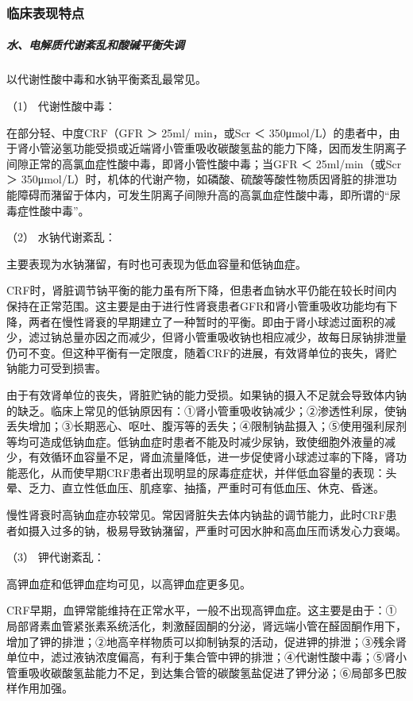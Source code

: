 \subsubsection{临床表现特点}

\subparagraph{水、电解质代谢紊乱和酸碱平衡失调}

以代谢性酸中毒和水钠平衡紊乱最常见。

\hypertarget{text00085.htmlux5cux23CHP3-8-6-1-1-1}{}
（1） 代谢性酸中毒：

在部分轻、中度CRF（GFR ＞ 25ml/ min，或Scr ＜
350μmol/L）的患者中，由于肾小管泌氢功能受损或近端肾小管重吸收碳酸氢盐的能力下降，因而发生阴离子间隙正常的高氯血症性酸中毒，即肾小管性酸中毒；当GFR
＜ 25ml/min（或Scr ＞
350μmol/L）时，机体的代谢产物，如磷酸、硫酸等酸性物质因肾脏的排泄功能障碍而潴留于体内，可发生阴离子间隙升高的高氯血症性酸中毒，即所谓的“尿毒症性酸中毒”。

\hypertarget{text00085.htmlux5cux23CHP3-8-6-1-1-2}{}
（2） 水钠代谢紊乱：

主要表现为水钠潴留，有时也可表现为低血容量和低钠血症。

CRF时，肾脏调节钠平衡的能力虽有所下降，但患者血钠水平仍能在较长时间内保持在正常范围。这主要是由于进行性肾衰患者GFR和肾小管重吸收功能均有下降，两者在慢性肾衰的早期建立了一种暂时的平衡。即由于肾小球滤过面积的减少，滤过钠总量亦因之而减少，但肾小管重吸收钠也相应减少，故每日尿钠排泄量仍可不变。但这种平衡有一定限度，随着CRF的进展，有效肾单位的丧失，肾贮钠能力可受到损害。

由于有效肾单位的丧失，肾脏贮钠的能力受损。如果钠的摄入不足就会导致体内钠的缺乏。临床上常见的低钠原因有：①肾小管重吸收钠减少；②渗透性利尿，使钠丢失增加；③长期恶心、呕吐、腹泻等的丢失；④限制钠盐摄入；⑤使用强利尿剂等均可造成低钠血症。低钠血症时患者不能及时减少尿钠，致使细胞外液量的减少，有效循环血容量不足，肾血流量降低，进一步促使肾小球滤过率的下降，肾功能恶化，从而使早期CRF患者出现明显的尿毒症症状，并伴低血容量的表现：头晕、乏力、直立性低血压、肌痉挛、抽搐，严重时可有低血压、休克、昏迷。

慢性肾衰时高钠血症亦较常见。常因肾脏失去体内钠盐的调节能力，此时CRF患者如摄入过多的钠，极易导致钠潴留，严重时可因水肿和高血压而诱发心力衰竭。

\hypertarget{text00085.htmlux5cux23CHP3-8-6-1-1-3}{}
（3） 钾代谢紊乱：

高钾血症和低钾血症均可见，以高钾血症更多见。

CRF早期，血钾常能维持在正常水平，一般不出现高钾血症。这主要是由于：①局部肾素血管紧张素系统活化，刺激醛固酮的分泌，肾远端小管在醛固酮作用下，增加了钾的排泄；②地高辛样物质可以抑制钠泵的活动，促进钾的排泄；③残余肾单位中，滤过液钠浓度偏高，有利于集合管中钾的排泄；④代谢性酸中毒；⑤肾小管重吸收碳酸氢盐能力不足，到达集合管的碳酸氢盐促进了钾分泌；⑥局部多巴胺样作用加强。


